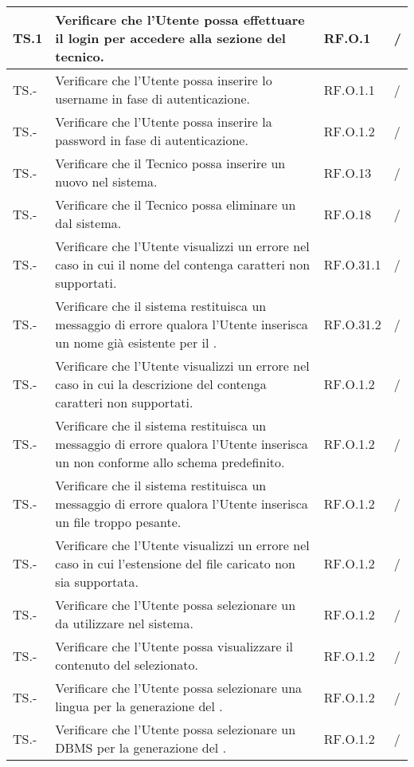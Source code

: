 \begin{adjustwidth}{-0.5cm}{-0.5cm}
\begin{longtable}{|P{1.5cm}|>{\raggedright}P{7cm}|P{2.5cm}|>{\arraybackslash}P{1.5cm}|}
		TS.1 & Verificare che l'Utente possa effettuare il login per accedere alla sezione del tecnico. & RF.O.1 & / \\ 
    \hline TS.- & Verificare che l'Utente possa inserire lo username in fase di autenticazione. & RF.O.1.1 & / \\ 
    \hline TS.- & Verificare che l'Utente possa inserire la password in fase di autenticazione. & RF.O.1.2 & / \\
		\hline TS.- & Verificare che il Tecnico possa inserire un nuovo  nel sistema. & RF.O.13 & / \\ 
		\hline TS.- & Verificare che il Tecnico possa eliminare un  dal sistema. & RF.O.18 & / \\ 
		\hline TS.- & Verificare che l'Utente visualizzi un errore nel caso in cui il nome del  contenga caratteri non supportati. & RF.O.31.1 & / \\ 
		\hline TS.- & Verificare che il sistema restituisca un messaggio di errore qualora l'Utente inserisca un nome già esistente per il . & RF.O.31.2 & / \\ 
		\hline TS.- & Verificare che l'Utente visualizzi un errore nel caso in cui la descrizione del  contenga caratteri non supportati. & RF.O.1.2 & / \\ 
		\hline TS.- & Verificare che il sistema restituisca un messaggio di errore qualora l'Utente inserisca un  non conforme allo schema predefinito. & RF.O.1.2 & / \\ 
		\hline TS.- & Verificare che il sistema restituisca un messaggio di errore qualora l'Utente inserisca un file troppo pesante. & RF.O.1.2 & / \\ 
		\hline TS.- & Verificare che l'Utente visualizzi un errore nel caso in cui l'estensione del file caricato non sia supportata. & RF.O.1.2 & / \\ 
		\hline TS.- & Verificare che l'Utente possa selezionare un  da utilizzare nel sistema. & RF.O.1.2 & / \\ 
		\hline TS.- & Verificare che l'Utente possa visualizzare il contenuto del  selezionato. & RF.O.1.2 & / \\ 
		\hline TS.- & Verificare che l'Utente possa selezionare una lingua per la generazione del . & RF.O.1.2 & / \\ 
		\hline TS.- & Verificare che l'Utente possa selezionare un DBMS per la generazione del . & RF.O.1.2 & / \\ 

\end{longtable}
\end{adjustwidth}
